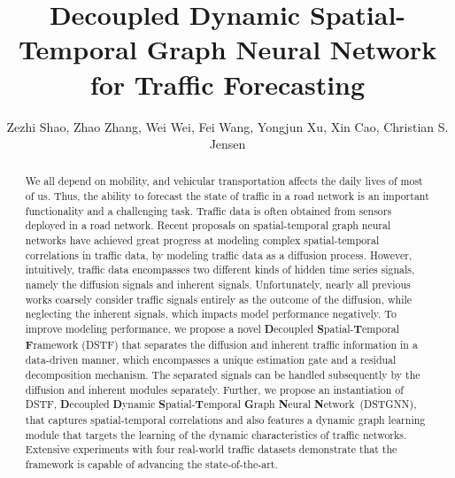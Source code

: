 \documentclass[sigconf, nonacm]{acmart}
\title{Decoupled Dynamic Spatial-Temporal Graph Neural Network for Traffic Forecasting}
\newcommand\vldbauthors{\authors}
\begin{document}
\author{Zezhi Shao, Zhao Zhang, Wei Wei, Fei Wang, Yongjun Xu, Xin Cao, Christian S. Jensen}


\renewcommand{\vldbauthors}{Zezhi Shao, Zhao Zhang, Wei Wei, Fei Wang, Yongjun Xu, Xin Cao, and Christian S. Jensen}
\begin{abstract}
We all depend on mobility, and vehicular transportation affects the daily lives of most of us.
Thus, the ability to forecast the state of traffic in a road network is an important functionality and {\color{black}a challenging task}.
Traffic data is {\color{black}often} obtained from sensors deployed in a road network. 
{\color{black}Recent proposals on spatial-temporal graph neural networks have achieved great progress at modeling complex spatial-temporal correlations in traffic data, by modeling traffic data as a diffusion process. 
However, intuitively, traffic data encompasses two different kinds of hidden time series signals, namely the diffusion signals and inherent signals.
Unfortunately, nearly all previous works coarsely consider traffic signals entirely as the outcome of the diffusion, while neglecting the inherent signals, which impacts model performance negatively.}
To improve modeling performance, {\color{black}we propose a novel \textbf{D}ecoupled \textbf{S}patial-\textbf{T}emporal \textbf{F}ramework (DSTF) that separates the diffusion and inherent traffic information in a data-driven manner, which encompasses a unique estimation gate and a residual decomposition mechanism.  
The separated signals can be handled subsequently by the diffusion and inherent modules separately.
Further, we propose an instantiation of DSTF, \textbf{D}ecoupled \textbf{D}ynamic \textbf{S}patial-\textbf{T}emporal \textbf{G}raph \textbf{N}eural \textbf{N}etwork~(DSTGNN), that} captures spatial-temporal {\color{black}correlations} and also features a dynamic graph learning module that targets the learning of the dynamic characteristics of traffic networks. 
Extensive experiments with four real-world traffic datasets demonstrate that the framework is capable of advancing the state-of-the-art.
\end{abstract}
 \maketitle
\end{document}
